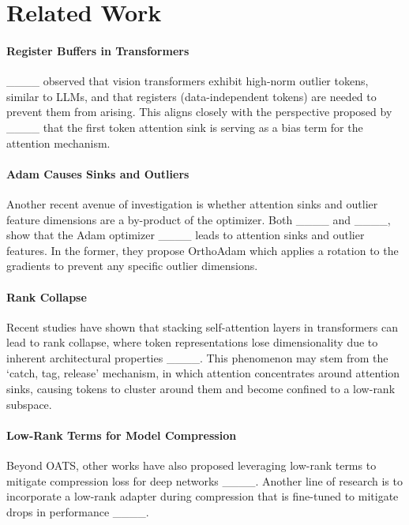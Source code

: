 \section{Related Work}
\paragraph{Register Buffers in Transformers} ____ observed that vision transformers exhibit high-norm outlier tokens, similar to LLMs, and that registers (data-independent tokens) are needed to prevent them from arising. This aligns closely with the perspective proposed by ____ that the first token attention sink is serving as a bias term for the attention mechanism.  
    \paragraph{Adam Causes Sinks and Outliers} Another recent avenue of investigation is whether attention sinks and outlier feature dimensions are a by-product of the optimizer. Both ____ and ____, show that the Adam optimizer ____ leads to attention sinks and outlier features. In the former, they propose OrthoAdam which applies a rotation to the gradients to prevent any specific outlier dimensions. 
    \paragraph{Rank Collapse} Recent studies have shown that stacking self-attention layers in transformers can lead to rank collapse, where token representations lose dimensionality due to inherent architectural properties ____. This phenomenon may stem from the `catch, tag, release' mechanism, in which attention concentrates around attention sinks, causing tokens to cluster around them and become confined to a low-rank subspace.
    \paragraph{Low-Rank Terms for Model Compression} Beyond OATS, other works have also proposed leveraging low-rank terms to mitigate compression loss for deep networks ____.  Another line of research is to incorporate a low-rank adapter during compression that is fine-tuned to mitigate drops in performance ____.